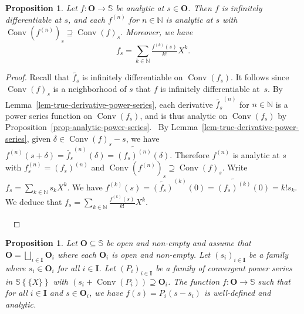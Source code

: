 \documentclass{article}
\newcommand{\of}{:}
\newcommand{\tmop}[1]{\ensuremath{\operatorname{#1}}}
\newtheorem{proposition}[theorem]{Proposition}
\theoremstyle{remark}\newtheorem*{convention*}{Convention}
\begin{document}
\begin{proposition}
  \label{prop-analytic-main}Let $f \of \mathbf{O} \longrightarrow \mathbb{S}$
  be analytic at $s \in \mathbf{O}$. Then $f$ is infinitely differentiable at
  $s$, and each $f^{(n)}$ for $n \in \mathbb{N}$ is analytic at $s$ with
  $\tmop{Conv} (f^{(n)})_s \supseteq \tmop{Conv} (f)_s$. Moreover, we have
  \[ f_s = \sum_{k \in \mathbb{N}} \tfrac{f^{(k)} (s)}{k!} X^k . \]
\end{proposition}

\begin{proof}
  Recall that $\widetilde{f_s}$ is infinitely differentiable on $\tmop{Conv}
  (f_s)$. It follows since $\tmop{Conv} (f)_s$ is a neighborhood of $s$ that
  $f$ is infinitely differentiable at~$s$. By
  Lemma~\ref{lem-true-derivative-power-series}, each derivative
  $\widetilde{f_s}^{(n)}$ for $n \in \mathbb{N}$ is a power series function on
  $\tmop{Conv} (f_s)$, and is thus analytic on $\tmop{Conv} (f_s)$ by
  Proposition~\ref{prop-analytic-power-series}. \ By
  Lemma~\ref{lem-true-derivative-power-series}, given $\delta \in \tmop{Conv}
  (f)_s - s$, we have $f^{(n)} (s + \delta) = \widetilde{f_s}^{(n)} (\delta) =
  \widetilde{(f_s)^{(n)}} (\delta)$. Therefore $f^{(n)}$ is analytic at $s$
  with $f^{(n)}_s = (f_s)^{(n)}$ and $\tmop{Conv} (f^{(n)})_s \supseteq
  \tmop{Conv} (f)_s$. Write $f_s = \sum_{k \in \mathbb{N}} s_k X^k$. We have
  $f^{(k)} (s) = \widetilde{(f_s)}^{(k)} (0) = \widetilde{(f_s)^{(k)}} (0) =
  k!s_k$. We deduce that $f_s = \sum_{k \in \mathbb{N}} \tfrac{f^{(k)}
  (s)}{k!} X^k$.
  
  \ 
\end{proof}

\begin{proposition}
  \label{prop-piecewise-analycity}Let $\mathbf{O} \subseteq \mathbb{S}$ be
  open and non-empty and assume that $\mathbf{O} = \bigsqcup_{i \in
  \mathbf{I}} \mathbf{O}_i$ where each $\mathbf{O}_i$ is open and non-empty.
  Let $(s_i)_{i \in \mathbf{I}}$ be a family where $s_i \in \mathbf{O}_i$ for
  all $i \in \mathbf{I}$. Let $(P_i)_{i \in \mathbf{I}}$ be a family of
  convergent power series in $\mathbb{S} \left\{ \!\! \{ X \} \!\! \right\}$
  with $(s_i + \tmop{Conv} (P_i)) \supseteq \mathbf{O}_i$. The function $f \of
  \mathbf{O} \longrightarrow \mathbb{S}$ such that for all $i \in \mathbf{I}$
  and $s \in \mathbf{O}_i$, we have $f (s) = P_i (s - s_i)$ is well-defined
  and analytic.
\end{proposition}
\end{document}
